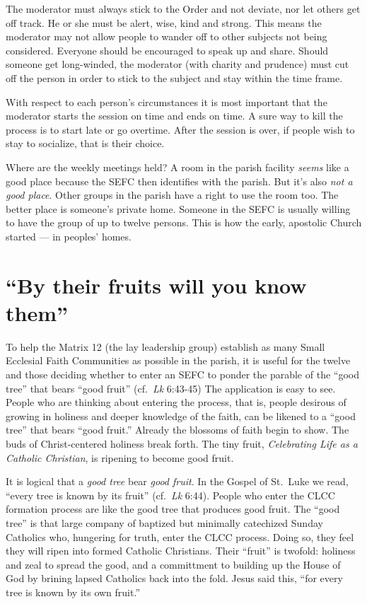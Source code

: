\documentclass{article}
\begin{document}
The moderator must always stick to the Order and not deviate, nor let others get
off track. He or she must be alert, wise, kind and strong. This means the
moderator may not allow people to wander off to other subjects not being
considered. Everyone should be encouraged to speak up and share. Should someone
get long-winded, the moderator (with charity and prudence) must cut off the
person in order to stick to the subject and stay within the time frame.

With respect to each person's circumstances it is most important that the
moderator starts the session on time and ends on time. A sure way to kill the
process is to start late or go overtime. After the session is over, if people
wish to stay to socialize, that is their choice.

Where are the weekly meetings held? A room in the parish facility \emph{seems}
like a good place because the SEFC then identifies with the parish. But it's
also \emph{not a good place}. Other groups in the parish have a right to use the
room too. The better place is someone's private home. Someone in the SEFC is
usually willing to have the group of up to twelve persons. This is how the
early, apostolic Church started --- in peoples' homes.

\section{``By their fruits will you know them''}

To help the Matrix 12 (the lay leadership group) establish as many Small
Ecclesial Faith Communities as possible in the parish, it is useful for the
twelve and those deciding whether to enter an SEFC to ponder the parable of the
``good tree'' that bears ``good fruit'' (cf.\ \emph{Lk} 6:43-45) The application
is easy to see. People who are thinking about entering the process, that is,
people desirous of growing in holiness and deeper knowledge of the faith, can be
likened to a ``good tree'' that bears ``good fruit.'' Already the blossoms of
faith begin to show. The buds of Christ-centered holiness break forth. The tiny
fruit, \emph{Celebrating Life as a Catholic Christian}, is ripening to become
good fruit.

It is logical that a \emph{good tree} bear \emph{good fruit}. In the Gospel of
St.\ Luke we read, ``every tree is known by its fruit'' (cf.\ \emph{Lk}
6:44). People who enter the CLCC formation process are like the good tree that
produces good fruit. The ``good tree'' is that large company of baptized but
minimally catechized Sunday Catholics who, hungering for truth, enter the CLCC
process. Doing so, they feel they will ripen into formed Catholic
Christians. Their ``fruit'' is twofold: holiness and zeal to spread the good,
and a committment to building up the House of God by brining lapsed Catholics
back into the fold. Jesus said this, ``for every tree is known by its own
fruit.''
\end{document}
